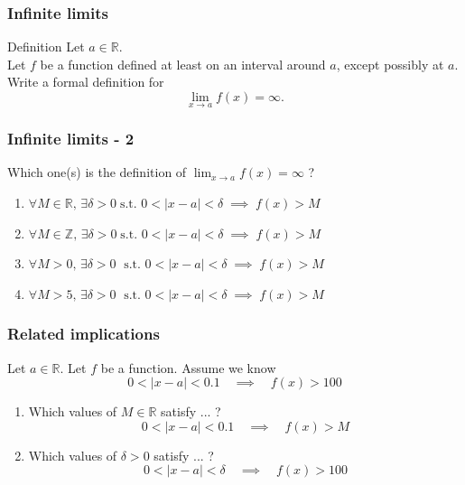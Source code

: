 \documentclass[14pt]{beamer}
\begin{document}
\begin{frame}
	\frametitle{Infinite limits}

	\begin{block}{Definition}
		Let $a \in \mathbb{R}$. \\ Let $f$ be a function defined at least on an
		interval around $a$, except possibly at $a$. \\ Write a formal definition
		for
		\[
			\lim_{x \to a}f(x) = \infty.
		\]
	\end{block}
\end{frame}

\begin{frame}[t]
	\frametitle{Infinite limits - 2}

	Which one(s) is the definition of $\displaystyle \lim_{x \to a}f(x) = \infty$ ?
	\vfill
	\begin{enumerate}
		\item $\displaystyle \forall M \in \mathbb{R}, \, \exists \delta > 0 \; \text{
			s.t. }0 < |x-a|<\delta \; \implies \; f(x) > M$
			\vfill

		\item $\displaystyle \forall M \in \mathbb{Z}, \, \exists \delta > 0 \; \text{
			s.t. }0 < |x-a|<\delta \; \implies \; f(x) > M$
			\vfill

		\item $\displaystyle \forall M > 0, \, \exists \delta > 0 \; \text{ s.t. }0 <
			|x-a|<\delta \; \implies \; f(x) > M$
			\vfill

		\item $\displaystyle \forall M > 5, \, \exists \delta > 0 \; \text{ s.t. }0 <
			|x-a|<\delta \; \implies \; f(x) > M$
			\vfill

	\end{enumerate}
\end{frame}

\begin{frame}[t]
	\frametitle{Related implications}

	Let $a \in \mathbb{R}$. Let $f$ be a function. Assume we know
	\[
		0 < |x-a| < 0.1 \quad \implies \quad f(x) > 100
	\]
	\vspace{-.5cm}
	\begin{enumerate}
		\item Which values of $M \in \mathbb{R}$ satisfy ... ?
			\[
				0 < |x-a| < 0.1 \quad \implies \quad f(x) > M
			\]
			\vspace{-.5cm}

		\item Which values of $\delta>0$ satisfy ... ?
			\[
				0 < |x-a| < \delta \quad \implies \quad f(x) > 100
			\]
	\end{enumerate}
\end{frame}
\end{document}
